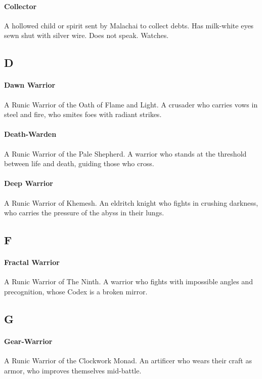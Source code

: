 \paragraph{Collector}
A hollowed child or spirit sent by Malachai to collect debts. Has milk-white eyes sewn shut with silver wire. Does not speak. Watches.

\subsection*{D}

\paragraph{Dawn Warrior}
A Runic Warrior of the Oath of Flame and Light. A crusader who carries vows in steel and fire, who smites foes with radiant strikes.

\paragraph{Death-Warden}
A Runic Warrior of the Pale Shepherd. A warrior who stands at the threshold between life and death, guiding those who cross.

\paragraph{Deep Warrior}
A Runic Warrior of Khemesh. An eldritch knight who fights in crushing darkness, who carries the pressure of the abyss in their lungs.

\subsection*{F}

\paragraph{Fractal Warrior}
A Runic Warrior of The Ninth. A warrior who fights with impossible angles and precognition, whose Codex is a broken mirror.

\subsection*{G}

\paragraph{Gear-Warrior}
A Runic Warrior of the Clockwork Monad. An artificer who wears their craft as armor, who improves themselves mid-battle.

